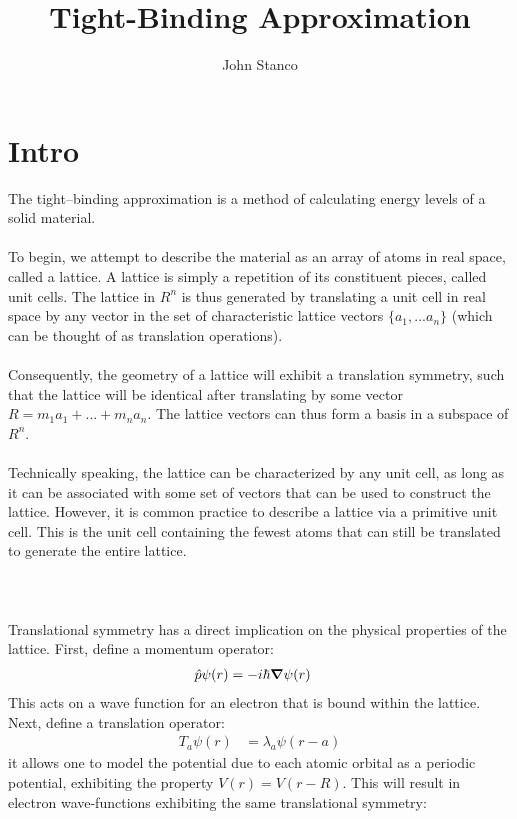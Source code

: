 \documentclass{article}
\begin{document}
\title{Tight-Binding Approximation}
\author{John Stanco}
\maketitle

\section*{Intro}

The tight–binding approximation is a method of calculating energy levels of a solid material.\\\\
To begin, we attempt to describe the material as an array of atoms in real space, called a lattice.  A lattice is simply a repetition of its constituent pieces, called unit cells.  The lattice in $R^n$ is thus generated by translating a unit cell in real space by any vector in the set of characteristic lattice vectors $\{a_1,...a_n\}$  (which can be thought of as translation operations). \\\\ 
Consequently, the geometry of a lattice will exhibit a translation symmetry, such that the lattice will be identical after translating by some vector $R = m_1a_1 + ... + m_na_n$.  The lattice vectors can thus form a basis in a subspace of $R^n$.\\\\
Technically speaking, the lattice can be characterized by any unit cell, as long as it can be associated with some set of vectors that can be used to construct the lattice.  However, it is common practice to describe a lattice via a primitive unit cell.  This is the unit cell containing the fewest atoms that can still be translated to generate the entire lattice.  \\\\
\\\\
Translational symmetry has a direct implication on the physical properties of the lattice.  First, define a momentum operator:
\begin{align*}
	\hat{p}\psi(r) &= -i\hbar\grad\psi(r)
\end{align*}
This acts on a wave function for an electron that is bound within the lattice.  Next, define a translation operator:
\begin{align*}
	T_a\psi(r) &= \lambda_a\psi(r - a)
\end{align*}
it allows one to model the potential due to each atomic orbital as a periodic potential, exhibiting the property $V(r) = V(r - R)$.  This will result in electron wave-functions exhibiting the same translational symmetry:
\end{document}
